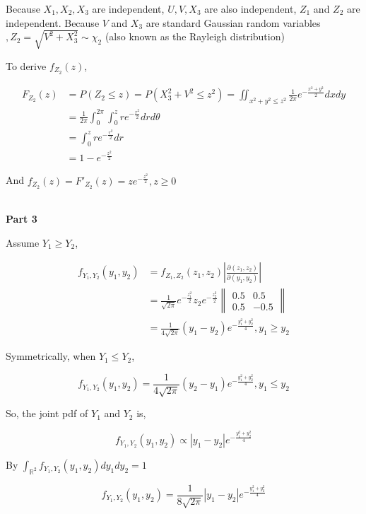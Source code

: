 \documentclass{article}
\begin{document}
Because $X_1,X_2,X_3$ are independent, $U,V,X_3$ are also independent, $Z_1$ and $Z_2$ are independent. Because $V$ and $X_3$ are standard Gaussian random variables $,Z_2 = \sqrt{V^2+X_3^2} \sim \chi_{2}$ (also known as the Rayleigh distribution)

To derive $f_{Z_2}(z)$,

\begin{equation}
    \begin{aligned}
        F_{Z_2}(z) & = P(Z_2\leqslant z)  = P(X_3^2+V^2\leqslant z^2) = \iint_{x^2+y^2\leqslant z^2 } \frac{1}{2\pi} e^{-\frac{x^2+y^2}{2}} dxdy 
        \\ & = \frac 1{2\pi} \int_{0}^{2\pi} \int_{0}^{z} re^{-\frac{r^2}{2}} drd\theta \\
        & = \int_{0}^{z} re^{-\frac{r^2}{2}} dr \\
        & = 1- e^{-\frac {z^2}{2}}
    \end{aligned}
\end{equation}

And $f_{Z_2}(z) = F'_{Z_2}(z) = z e^{-\frac {z^2}{2}}, z\geqslant 0$

~\\

\textbf{Part 3}

Assume $Y_1 \geqslant Y_2$, 

\begin{equation}
    \begin{aligned}
        f_{Y_1,Y_2}(y_1, y_2) & =f_{Z_1,Z_2}(z_1, z_2)\left|\frac{\partial(z_1, z_2)}{\partial(y_1, y_2)}\right| \\
        & = \frac {1}{\sqrt{2\pi}} e^{-\frac{z_1^2}{2}} z_2 e^{-\frac {z_2^2}{2}}\left\|\begin{matrix}
            0.5  & 0.5 \\ 
            0.5 &  -0.5
        \end{matrix}\right\| \\
        & = \frac{1}{4\sqrt{2\pi}} (y_1-y_2) e^{-\frac{y_1^2+y_2^2}{4}}, y_1\geqslant y_2
    \end{aligned}
\end{equation}

Symmetrically, when $Y_1 \leqslant Y_2$,

\begin{equation}
    f_{Y_1,Y_2}(y_1, y_2) = \frac{1}{4\sqrt{2\pi}} (y_2-y_1) e^{-\frac{y_1^2+y_2^2}{4}}, y_1\leqslant y_2
\end{equation}


So, the joint pdf of $Y_1$ and $Y_2$ is,

\begin{equation}
    f_{Y_1,Y_2}(y_1, y_2) \propto \left|y_1-y_2\right| e^{-\frac{y_1^2+y_2^2}{4}}
\end{equation}

By $\int_{\mathbb{R}^2}  f_{Y_1,Y_2}(y_1, y_2) dy_1dy_2= 1 $

\begin{equation}
    f_{Y_1,Y_2}(y_1, y_2) =  \frac{1}{8\sqrt{2\pi}}  \left|y_1-y_2\right| e^{-\frac{y_1^2+y_2^2}{4}}
\end{equation}
\end{document}
